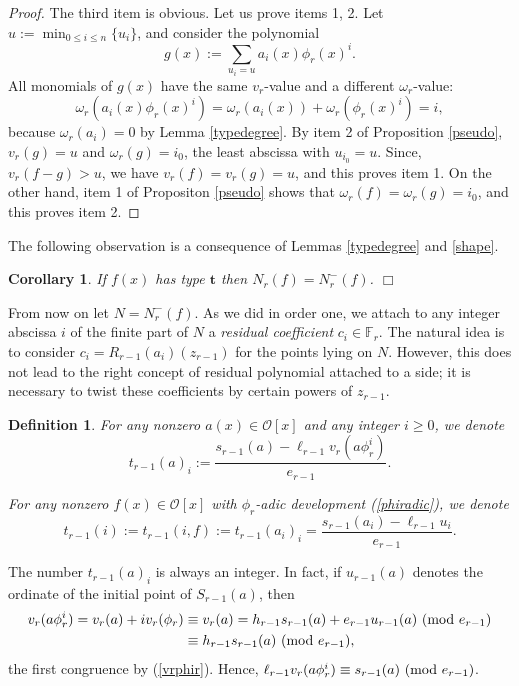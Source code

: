 \documentclass{amsart}
\newtheorem{definition}[theorem]{Definition}
\newtheorem{corollary}[theorem]{Corollary}
\def\ff#1{\mathbb{F}_{#1}}
\def\md#1{\ \mbox{\rm(mod }{#1})}
\def\om{\omega}
\def\oo{{\mathcal O}}
\def\ty{\mathbf{t}}
\def\zpx{\oo[x]}
\begin{document}
\begin{proof}
The third item is obvious. Let us prove items 1, 2. Let $u:=\min_{0\le i\le n}\{u_i\}$, and consider the polynomial
$$
g(x):=\sum_{u_i=u}a_i(x)\phi_r(x)^i.
$$
All monomials of $g(x)$ have the same $v_r$-value and a different $\om_r$-value:
$$
\om_r(a_i(x)\phi_r(x)^i)=\om_r(a_i(x))+\om_r(\phi_r(x)^i)=i,
$$
because $\om_r(a_i)=0$ by Lemma \ref{typedegree}.
By item 2 of Proposition \ref{pseudo}, $v_r(g)=u$ and $\om_r(g)=i_0$, the least abscissa with $u_{i_0}=u$. Since, $v_r(f-g)>u$, we have $v_r(f)=v_r(g)=u$, and this proves item 1. 
On the other hand, item 1 of Propositon \ref{pseudo} shows that $\om_r(f)=\om_r(g)=i_0$, and this proves item 2. 
\end{proof}

The following observation is a consequence of Lemmas \ref{typedegree} and \ref{shape}.
\begin{corollary}\label{rminus}
If $f(x)$ has type $\ty$ then $N_r(f)=N_r^-(f)$. \hfill{$\Box$}
\end{corollary}

From now on let $N=N_r^-(f)$. As we did in order one, we attach to any integer abscissa $i$ of the finite part of $N$ a \emph{residual coefficient} $c_i\in\ff{r}$. The natural idea is to consider 
$c_i=R_{r-1}(a_i)(z_{r-1})$ for the points lying on $N$. However, this does not lead to the right concept of residual polynomial attached to a side; it is necessary to twist these coefficients by certain powers of $z_{r-1}$. 

\begin{definition}\label{t(i)}
For any nonzero $a(x)\in\zpx$ and any integer $i\ge 0$, we denote 
$$t_{r-1}(a)_i:=\dfrac{s_{r-1}(a)-\ell_{r-1} v_r(a\phi_r^i)}{e_{r-1}}.
$$ 

For any nonzero $f(x)\in\zpx$ with $\phi_r$-adic development (\ref{phiradic}), we denote
$$t_{r-1}(i):=t_{r-1}(i,f):=t_{r-1}(a_i)_i=\dfrac{s_{r-1}(a_i)-\ell_{r-1} u_i}{e_{r-1}}.
$$ 
\end{definition}

The number $t_{r-1}(a)_i$ is always an integer. In fact, if $u_{r-1}(a)$ denotes the ordinate of the initial point of $S_{r-1}(a)$, then
\begin{align*}
v_r(a\phi_r^i)=v_r(a)+iv_r(\phi_r)&\equiv v_r(a)=h_{r-1}s_{r-1}(a)+e_{r-1}u_{r-1}(a)\md{e_{r-1}}\\&\equiv h_{r-1}s_{r-1}(a)\md{e_{r-1}},
\end{align*}
the first congruence by (\ref{vrphir}). Hence, $\ell_{r-1}v_r(a\phi_r^i)\equiv s_{r-1}(a)\md{e_{r-1}}$.
\end{document}
